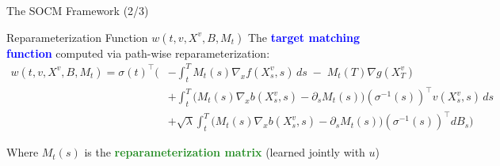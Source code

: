 \documentclass[aspectratio=169,xcolor=dvipsnames]{beamer}
\begin{document}
\begin{frame}{The SOCM Framework (2/3)}
    \vspace{-0.3cm}
    
    \begin{block}{Reparameterization Function $w(t, v, X^v, B, M_t)$}
        \small
        The \textcolor{blue}{\textbf{target matching function}} computed via path-wise reparameterization:
        \vspace{-0.2cm}
        \begin{equation}
        \begin{aligned}
        w(t, v, X^v, B, M_t) 
        = \sigma(t)^\top \Bigg(
        &- \int_t^T M_t(s) \nabla_x f(X_s^v, s)\, ds 
           \;-\; M_t(T)\nabla g(X_T^v) \\[4pt]
        &+ \int_t^T \big(M_t(s)\nabla_x b(X_s^v, s) - \partial_s M_t(s)\big)(\sigma^{-1}(s))^\top v(X_s^v, s)\, ds \\[4pt]
        &+ \sqrt{\lambda} \int_t^T \big(M_t(s)\nabla_x b(X_s^v, s) - \partial_s M_t(s)\big)(\sigma^{-1}(s))^\top dB_s
        \Bigg)
        \end{aligned}
        \end{equation}
        
        Where $M_t(s)$ is the \textcolor{ForestGreen}{\textbf{reparameterization matrix}} (learned jointly with $u$)
    \end{block}

\end{frame}
    
\end{document}

